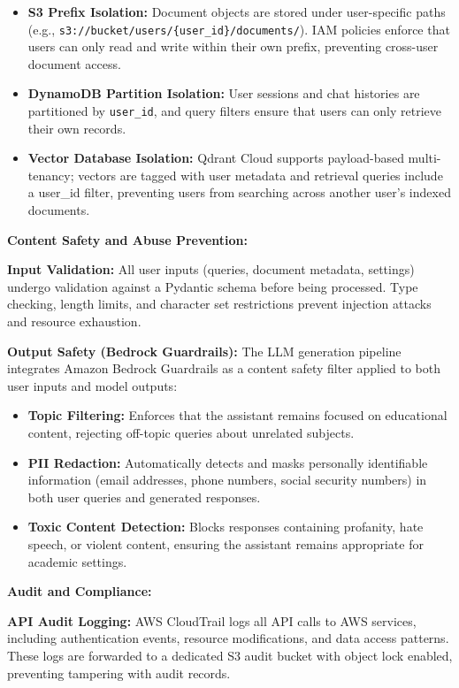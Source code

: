 \begin{itemize}
    \item \textbf{S3 Prefix Isolation:} Document objects are stored under user-specific paths (e.g., \texttt{s3://bucket/users/\{user\_id\}/documents/}). IAM policies enforce that users can only read and write within their own prefix, preventing cross-user document access.
    \item \textbf{DynamoDB Partition Isolation:} User sessions and chat histories are partitioned by \texttt{user\_id}, and query filters ensure that users can only retrieve their own records.
    \item \textbf{Vector Database Isolation:} Qdrant Cloud supports payload-based multi-tenancy; vectors are tagged with user metadata and retrieval queries include a user\_id filter, preventing users from searching across another user's indexed documents.
\end{itemize}

\textbf{Content Safety and Abuse Prevention:}

\textbf{Input Validation:} All user inputs (queries, document metadata, settings) undergo validation against a Pydantic schema before being processed. Type checking, length limits, and character set restrictions prevent injection attacks and resource exhaustion.

\textbf{Output Safety (Bedrock Guardrails):} The LLM generation pipeline integrates Amazon Bedrock Guardrails as a content safety filter applied to both user inputs and model outputs:

\begin{itemize}
    \item \textbf{Topic Filtering:} Enforces that the assistant remains focused on educational content, rejecting off-topic queries about unrelated subjects.
    \item \textbf{PII Redaction:} Automatically detects and masks personally identifiable information (email addresses, phone numbers, social security numbers) in both user queries and generated responses.
    \item \textbf{Toxic Content Detection:} Blocks responses containing profanity, hate speech, or violent content, ensuring the assistant remains appropriate for academic settings.
\end{itemize}

\textbf{Audit and Compliance:}

\textbf{API Audit Logging:} AWS CloudTrail logs all API calls to AWS services, including authentication events, resource modifications, and data access patterns. These logs are forwarded to a dedicated S3 audit bucket with object lock enabled, preventing tampering with audit records.

